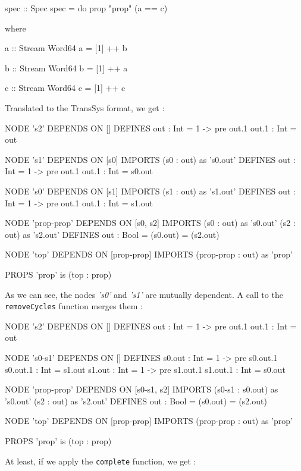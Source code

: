 \begin{code}
spec :: Spec
spec = do
  prop "prop" (a == c)

  where

    a :: Stream Word64
    a = [1] ++ b
    
    b :: Stream Word64
    b = [1] ++ a

    c :: Stream Word64
    c = [1] ++ c
\end{code}
Translated to the TransSys format, we get :
\begin{code}
NODE 's2' DEPENDS ON []
DEFINES
    out : Int =
        1 -> pre out.1
    out.1 : Int =
        out

NODE 's1' DEPENDS ON [s0]
IMPORTS
    (s0 : out) as 's0.out'
DEFINES
    out : Int =
        1 -> pre out.1
    out.1 : Int =
        s0.out

NODE 's0' DEPENDS ON [s1]
IMPORTS
    (s1 : out) as 's1.out'
DEFINES
    out : Int =
        1 -> pre out.1
    out.1 : Int =
        s1.out

NODE 'prop-prop' DEPENDS ON [s0, s2]
IMPORTS
    (s0 : out) as 's0.out'
    (s2 : out) as 's2.out'
DEFINES
    out : Bool =
        (s0.out) = (s2.out)

NODE 'top' DEPENDS ON [prop-prop]
IMPORTS
    (prop-prop : out) as 'prop'

PROPS
'prop' is (top : prop)
\end{code}
As we can see, the nodes \textit{'s0'} and \textit{'s1'} are mutually dependent. A call to the \texttt{removeCycles} function merges them :
\begin{code}
NODE 's2' DEPENDS ON []
DEFINES
    out : Int =
        1 -> pre out.1
    out.1 : Int =
        out

NODE 's0-s1' DEPENDS ON []
DEFINES
    s0.out : Int =
        1 -> pre s0.out.1
    s0.out.1 : Int =
        s1.out
    s1.out : Int =
        1 -> pre s1.out.1
    s1.out.1 : Int =
        s0.out

NODE 'prop-prop' DEPENDS ON [s0-s1, s2]
IMPORTS
    (s0-s1 : s0.out) as 's0.out'
    (s2 : out) as 's2.out'
DEFINES
    out : Bool =
        (s0.out) = (s2.out)

NODE 'top' DEPENDS ON [prop-prop]
IMPORTS
    (prop-prop : out) as 'prop'

PROPS
'prop' is (top : prop) 
\end{code}
At least, if we apply the \texttt{complete} function, we get :

